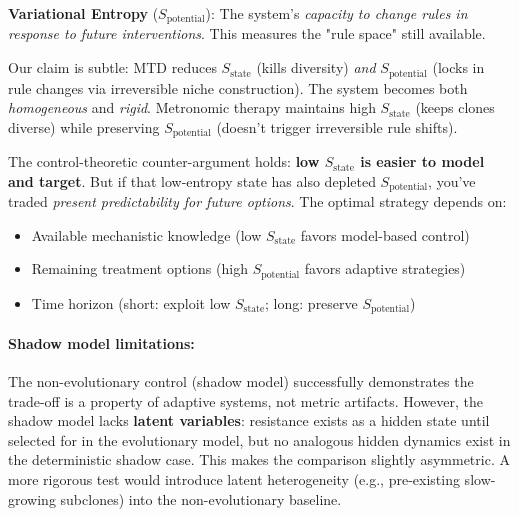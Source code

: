 \documentclass[11pt,a4paper]{article}
\begin{document}
\textbf{Variational Entropy} ($S_{\text{potential}}$): The system's \textit{capacity to change rules in response to future interventions}. This measures the "rule space" still available.

Our claim is subtle: MTD reduces $S_{\text{state}}$ (kills diversity) \textit{and} $S_{\text{potential}}$ (locks in rule changes via irreversible niche construction). The system becomes both \textit{homogeneous} and \textit{rigid}. Metronomic therapy maintains high $S_{\text{state}}$ (keeps clones diverse) while preserving $S_{\text{potential}}$ (doesn't trigger irreversible rule shifts).

The control-theoretic counter-argument holds: \textbf{low $S_{\text{state}}$ is easier to model and target}. But if that low-entropy state has also depleted $S_{\text{potential}}$, you've traded \textit{present predictability for future options}. The optimal strategy depends on:
\begin{itemize}
    \item Available mechanistic knowledge (low $S_{\text{state}}$ favors model-based control)
    \item Remaining treatment options (high $S_{\text{potential}}$ favors adaptive strategies)
    \item Time horizon (short: exploit low $S_{\text{state}}$; long: preserve $S_{\text{potential}}$)
\end{itemize}

\paragraph{Shadow model limitations:}
The non-evolutionary control (shadow model) successfully demonstrates the trade-off is a property of adaptive systems, not metric artifacts. However, the shadow model lacks \textbf{latent variables}: resistance exists as a hidden state until selected for in the evolutionary model, but no analogous hidden dynamics exist in the deterministic shadow case. This makes the comparison slightly asymmetric. A more rigorous test would introduce latent heterogeneity (e.g., pre-existing slow-growing subclones) into the non-evolutionary baseline.
\end{document}
